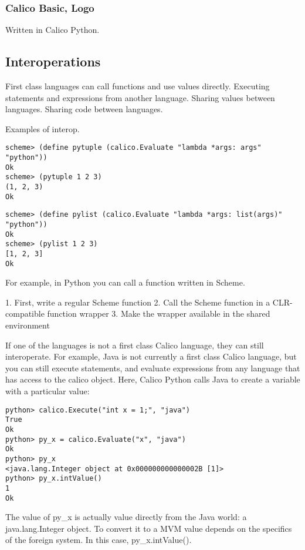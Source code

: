 \documentclass[preprint]{sigplanconf}
\begin{document}
\subsubsection{Calico Basic, Logo}


Written in Calico Python. 


\subsection{Interoperations}


First class languages can call functions and use values directly. Executing statements and expressions from another language. 
Sharing values between languages.
Sharing code between languages.


Examples of interop.


\begin{verbatim}
scheme> (define pytuple (calico.Evaluate "lambda *args: args" "python"))
Ok
scheme> (pytuple 1 2 3)
(1, 2, 3)
Ok
\end{verbatim}




\begin{verbatim}
scheme> (define pylist (calico.Evaluate "lambda *args: list(args)" "python"))
Ok
scheme> (pylist 1 2 3)
[1, 2, 3]
Ok
\end{verbatim}


For example, in Python you can call a function written in Scheme.


1. First, write a regular Scheme function
2. Call the Scheme function in a CLR-compatible function wrapper
3. Make the wrapper available in the shared environment


If one of the languages is not a first class Calico language, they can still interoperate. For example, Java is not currently a first class Calico language, but you can still execute statements, and evaluate expressions from any language that has access to the calico object. Here, Calico Python calls Java to create a variable with a particular value:


\begin{verbatim}
python> calico.Execute("int x = 1;", "java")
True
Ok
python> py_x = calico.Evaluate("x", "java")
Ok
python> py_x
<java.lang.Integer object at 0x000000000000002B [1]>
python> py_x.intValue()
1
Ok
\end{verbatim}


The value of py\_x is actually value directly from the Java world: a java.lang.Integer object. To convert it to a MVM value depends on the specifics of the foreign system. In this case, py\_x.intValue().
\end{document}
